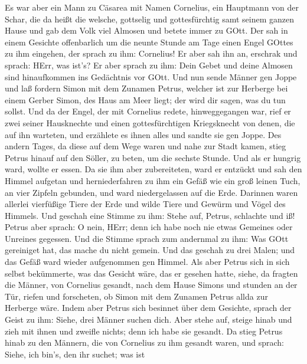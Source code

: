  Es war aber ein Mann zu Cäsarea mit Namen Cornelius, ein
Hauptmann von der Schar, die da heißt die welsche, 
gottselig und gottesfürchtig samt seinem ganzen Hause und gab dem Volk
viel Almosen und betete immer zu GOtt.  Der sah in einem
Gesichte offenbarlich um die neunte Stunde am Tage einen Engel GOttes zu
ihm eingehen, der sprach zu ihm: Cornelius!  Er aber sah ihn
an, erschrak und sprach: HErr, was ist's? Er aber sprach zu ihm: Dein
Gebet und deine Almosen sind hinaufkommen ins Gedächtnis vor GOtt.
 Und nun sende Männer gen Joppe und laß fordern Simon mit
dem Zunamen Petrus,  welcher ist zur Herberge bei einem
Gerber Simon, des Haus am Meer liegt; der wird dir sagen, was du tun
sollst.  Und da der Engel, der mit Cornelius redete,
hinweggegangen war, rief er zwei seiner Hausknechte und einen
gottesfürchtigen Kriegsknecht von denen, die auf ihn warteten,
 und erzählete es ihnen alles und sandte sie gen Joppe.
 Des andern Tages, da diese auf dem Wege waren und nahe zur
Stadt kamen, stieg Petrus hinauf auf den Söller, zu beten, um die
sechste Stunde.  Und als er hungrig ward, wollte er essen.
Da sie ihm aber zubereiteten, ward er entzückt  und sah den
Himmel aufgetan und herniederfahren zu ihm ein Gefäß wie ein groß leinen
Tuch, an vier Zipfeln gebunden, und ward niedergelassen auf die Erde.
 Darinnen waren allerlei vierfüßige Tiere der Erde und
wilde Tiere und Gewürm und Vögel des Himmels.  Und geschah
eine Stimme zu ihm: Stehe auf, Petrus, schlachte und iß! 
Petrus aber sprach: O nein, HErr; denn ich habe noch nie etwas Gemeines
oder Unreines gegessen.  Und die Stimme sprach zum
andernmal zu ihm: Was GOtt gereiniget hat, das mache du nicht gemein.
 Und das geschah zu drei Malen; und das Gefäß ward wieder
aufgenommen gen Himmel.  Als aber Petrus sich in sich
selbst bekümmerte, was das Gesicht wäre, das er gesehen hatte, siehe, da
fragten die Männer, von Cornelius gesandt, nach dem Hause Simons und
stunden an der Tür,  riefen und forscheten, ob Simon mit
dem Zunamen Petrus allda zur Herberge wäre.  Indem aber
Petrus sich besinnet über dem Gesichte, sprach der Geist zu ihm: Siehe,
drei Männer suchen dich.  Aber stehe auf, steige hinab und
zieh mit ihnen und zweifle nichts; denn ich habe sie gesandt.
 Da stieg Petrus hinab zu den Männern, die von Cornelius zu
ihm gesandt waren, und sprach: Siehe, ich bin's, den ihr suchet; was ist

